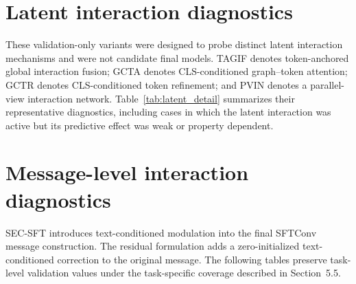 \documentclass[a4paper,fleqn]{cas-sc}
\begin{document}
\section{Latent interaction diagnostics}\label{app:latent}
These validation-only variants were designed to probe distinct latent interaction mechanisms and were not candidate final models. TAGIF denotes token-anchored global interaction fusion; GCTA denotes CLS-conditioned graph--token attention; GCTR denotes CLS-conditioned token refinement; and PVIN denotes a parallel-view interaction network. Table~\ref{tab:latent_detail} summarizes their representative diagnostics, including cases in which the latent interaction was active but its predictive effect was weak or property dependent.

\begin{table}[!htbp]\caption{Validation-only diagnostics for latent interaction variants. All values are computed on validation sets; no test evaluation is used for these variants.}\label{tab:latent_detail}\centering\scriptsize
{}
\end{table}

\section{Message-level interaction diagnostics}\label{app:message}
SEC-SFT introduces text-conditioned modulation into the final SFTConv message construction. The residual formulation adds a zero-initialized text-conditioned correction to the original message. The following tables preserve task-level validation values under the task-specific coverage described in Section~5.5.
\end{document}
